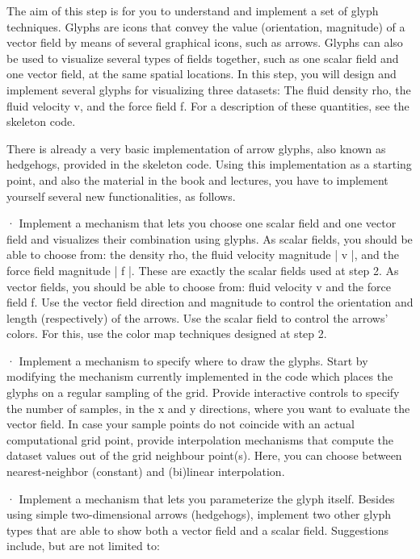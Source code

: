 The aim of this step is for you to understand and implement a set of glyph techniques. Glyphs are icons that convey the value (orientation, magnitude) of a vector field by means of several graphical icons, such as arrows. Glyphs can also be used to visualize several types of fields together, such as one scalar field and one vector field, at the same spatial locations. In this step, you will design and implement several glyphs for visualizing three datasets: The fluid density rho, the fluid velocity v, and the force field f. For a description of these quantities, see the skeleton code.
 
There is already a very basic implementation of arrow glyphs, also known as hedgehogs, provided in the skeleton code. Using this implementation as a starting point, and also the material in the book and lectures, you have to implement yourself several new functionalities, as follows.
 
·        Implement a mechanism that lets you choose one scalar field and one vector field and visualizes their combination using glyphs. As scalar fields, you should be able to choose from: the density rho, the fluid velocity magnitude | v |, and the force field magnitude | f |. These are exactly the scalar fields used at step 2. As vector fields, you should be able to choose from: fluid velocity v and the force field f. Use the vector field direction and magnitude to control the orientation and length (respectively) of the arrows. Use the scalar field to control the arrows’ colors. For this, use the color map techniques designed at step 2.
 
·        Implement a mechanism to specify where to draw the glyphs. Start by modifying the mechanism currently implemented in the code which places the glyphs on a regular sampling of the grid. Provide interactive controls to specify the number of samples, in the x and y directions, where you want to evaluate the vector field. In case your sample points do not coincide with an actual computational grid point, provide interpolation mechanisms that compute the dataset values out of the grid neighbour point(s). Here, you can choose between nearest-neighbor (constant) and (bi)linear interpolation.
 
·        Implement a mechanism that lets you parameterize the glyph itself. Besides using simple two-dimensional arrows (hedgehogs), implement two other glyph types that are able to show both a vector field and a scalar field. Suggestions include, but are not limited to:
 
